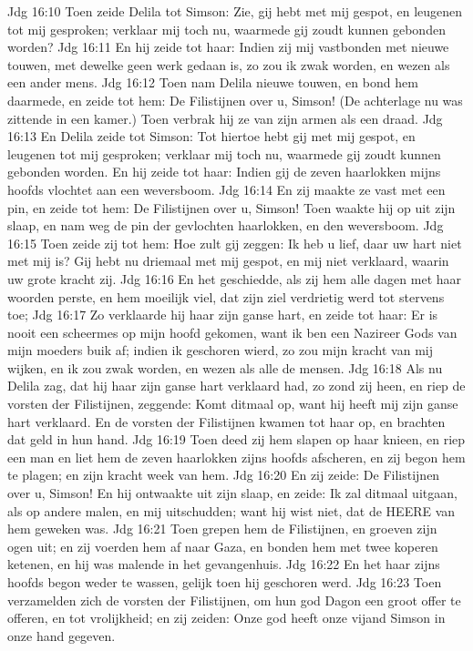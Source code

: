 Jdg 16:10  Toen zeide Delila tot Simson: Zie, gij hebt met mij gespot, en leugenen tot mij gesproken; verklaar mij toch nu, waarmede gij zoudt kunnen gebonden worden?
Jdg 16:11  En hij zeide tot haar: Indien zij mij vastbonden met nieuwe touwen, met dewelke geen werk gedaan is, zo zou ik zwak worden, en wezen als een ander mens.
Jdg 16:12  Toen nam Delila nieuwe touwen, en bond hem daarmede, en zeide tot hem: De Filistijnen over u, Simson! (De achterlage nu was zittende in een kamer.) Toen verbrak hij ze van zijn armen als een draad.
Jdg 16:13  En Delila zeide tot Simson: Tot hiertoe hebt gij met mij gespot, en leugenen tot mij gesproken; verklaar mij toch nu, waarmede gij zoudt kunnen gebonden worden. En hij zeide tot haar: Indien gij de zeven haarlokken mijns hoofds vlochtet aan een weversboom.
Jdg 16:14  En zij maakte ze vast met een pin, en zeide tot hem: De Filistijnen over u, Simson! Toen waakte hij op uit zijn slaap, en nam weg de pin der gevlochten haarlokken, en den weversboom.
Jdg 16:15  Toen zeide zij tot hem: Hoe zult gij zeggen: Ik heb u lief, daar uw hart niet met mij is? Gij hebt nu driemaal met mij gespot, en mij niet verklaard, waarin uw grote kracht zij.
Jdg 16:16  En het geschiedde, als zij hem alle dagen met haar woorden perste, en hem moeilijk viel, dat zijn ziel verdrietig werd tot stervens toe;
Jdg 16:17  Zo verklaarde hij haar zijn ganse hart, en zeide tot haar: Er is nooit een scheermes op mijn hoofd gekomen, want ik ben een Nazireer Gods van mijn moeders buik af; indien ik geschoren wierd, zo zou mijn kracht van mij wijken, en ik zou zwak worden, en wezen als alle de mensen.
Jdg 16:18  Als nu Delila zag, dat hij haar zijn ganse hart verklaard had, zo zond zij heen, en riep de vorsten der Filistijnen, zeggende: Komt ditmaal op, want hij heeft mij zijn ganse hart verklaard. En de vorsten der Filistijnen kwamen tot haar op, en brachten dat geld in hun hand.
Jdg 16:19  Toen deed zij hem slapen op haar knieen, en riep een man en liet hem de zeven haarlokken zijns hoofds afscheren, en zij begon hem te plagen; en zijn kracht week van hem.
Jdg 16:20  En zij zeide: De Filistijnen over u, Simson! En hij ontwaakte uit zijn slaap, en zeide: Ik zal ditmaal uitgaan, als op andere malen, en mij uitschudden; want hij wist niet, dat de HEERE van hem geweken was.
Jdg 16:21  Toen grepen hem de Filistijnen, en groeven zijn ogen uit; en zij voerden hem af naar Gaza, en bonden hem met twee koperen ketenen, en hij was malende in het gevangenhuis.
Jdg 16:22  En het haar zijns hoofds begon weder te wassen, gelijk toen hij geschoren werd.
Jdg 16:23  Toen verzamelden zich de vorsten der Filistijnen, om hun god Dagon een groot offer te offeren, en tot vrolijkheid; en zij zeiden: Onze god heeft onze vijand Simson in onze hand gegeven.
